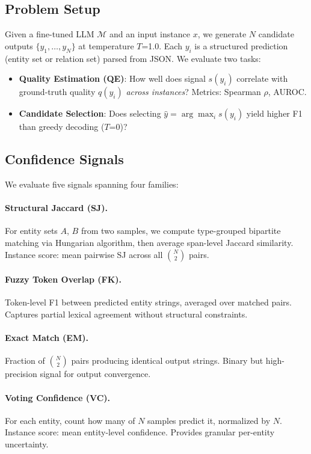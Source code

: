 \documentclass[11pt]{article}
\begin{document}
\subsection{Problem Setup}

Given a fine-tuned LLM $\mathcal{M}$ and an input instance $x$, we generate $N$ candidate outputs $\{y_1, \ldots, y_N\}$ at temperature $T$=1.0. Each $y_i$ is a structured prediction (entity set or relation set) parsed from JSON. We evaluate two tasks:
\begin{itemize}
\item \textbf{Quality Estimation (QE)}: How well does signal $s(y_i)$ correlate with ground-truth quality $q(y_i)$ \emph{across instances}? Metrics: Spearman $\rho$, AUROC.
\item \textbf{Candidate Selection}: Does selecting $\hat{y} = \arg\max_i s(y_i)$ yield higher F1 than greedy decoding ($T$=0)?
\end{itemize}

\subsection{Confidence Signals}

We evaluate five signals spanning four families:

\paragraph{Structural Jaccard (SJ).} For entity sets $A$, $B$ from two samples, we compute type-grouped bipartite matching via Hungarian algorithm, then average span-level Jaccard similarity. Instance score: mean pairwise SJ across all $\binom{N}{2}$ pairs.

\paragraph{Fuzzy Token Overlap (FK).} Token-level F1 between predicted entity strings, averaged over matched pairs. Captures partial lexical agreement without structural constraints.

\paragraph{Exact Match (EM).} Fraction of $\binom{N}{2}$ pairs producing identical output strings. Binary but high-precision signal for output convergence.

\paragraph{Voting Confidence (VC).} For each entity, count how many of $N$ samples predict it, normalized by $N$. Instance score: mean entity-level confidence. Provides granular per-entity uncertainty.
\end{document}
